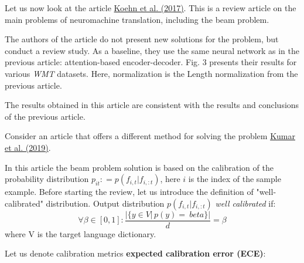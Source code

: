 \documentclass[a4paper,14pt]{extarticle}
\newcommand{\bibref}[3]{\hyperlink{#1}{#2 (#3)}}
\begin{document}
	Let us now look at the article \bibref{six_chall}{Koehn et al.}{2017}. This is a review article on the main problems of neuromachine translation, including the beam problem.
	
	The authors of the article do not present new solutions for the problem, but conduct a review study. As a baseline, they use the same neural network as in the previous article: attention-based encoder-decoder. Fig. 3 presents their results for various \textit{WMT} datasets. Here, normalization is the Length normalization from the previous article.
	
	\begin{figure}[t]
	\end{figure}
	
	The results obtained in this article are consistent with the results and conclusions of the previous article.
	
	Consider an article that offers a different method for solving the problem \bibref{calibration}{Kumar et al.}{2019}.

	In this article the beam problem solution is based on the calibration of the probability distribution $p_{it}: = p(f_{i, t} | f_{i,:t})$, here $i$ is the index of the sample example. Before starting the review, let us introduce the definition of "well-calibrated" distribution. Output distribution $p (f_{i, t} | f_{i, :t})$ \textit{well calibrated} if:
	\[
		\forall \beta \in [0, 1]: \frac{ | \{ y \in V |\, p(y) = \ beta \} | }{d}=\beta
	\]
	where V is the target language dictionary.
	
	Let us denote calibration metrics \textbf{expected calibration error (ECE)}:
	
\end{document}
